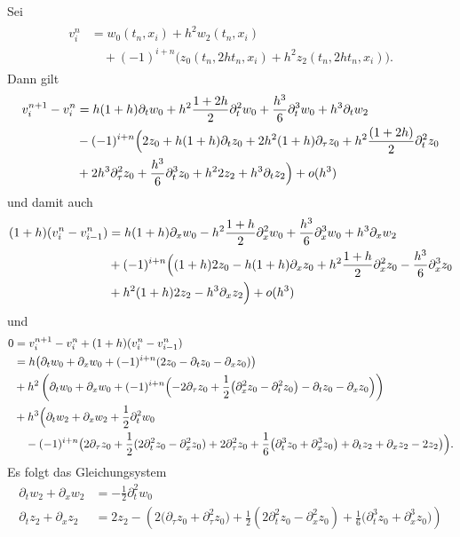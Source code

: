 Sei
\begin{align}
\begin{split}
v^n_i &= w_0(t_n, x_i) + h^2 w_2(t_n, x_i)\\
&\quad + (-1)^{i+n} \bigl( z_0(t_n, 2 h t_n, x_i) + h^2 z_2(t_n, 2 h t_n, x_i) \bigr).
\end{split}
\end{align}
Dann gilt
\begin{align}
\begin{split}
v^{n+1}_i - v^n_i &= h (1 + h) \partial_t w_0 + h^2 \frac{1 + 2h}{2} \partial^2_t w_0 +  \frac{h^3}{6} \partial^3_t w_0 + h^3 \partial_t w_2\\
&- (-1)^{i+n} \Bigl( 2z_0 + h (1 + h) \partial_t z_0  + 2 h^2 (1 + h) \partial_\tau z_0 + h^2 \frac{(1 + 2h)}{2} \partial^2_t z_0\\
& + 2 h^3 \partial^2_\tau z_0 + \frac{h^3}{6} \partial^3_t z_0 + h^2 2 z_2 + h^3 \partial_t z_2 \Bigr) + o(h^3)
\end{split}
\end{align}
und damit auch
\begin{align}
\begin{split}
(1 + h) (v^n_i - v^n_{i-1}) &= h (1 + h) \partial_x w_0 - h^2 \frac{1 + h}{2} \partial^2_x w_0 + \frac{h^3}{6} \partial^3_x w_0+ h^3 \partial_x w_2\\
&+ (-1)^{i+n} \Bigl( (1+h)2z_0 - h(1+h) \partial_x z_0 + h^2 \frac{1+h}{2} \partial^2_x z_0 - \frac{h^3}{6} \partial^3_x z_0\\
&+ h^2 (1 + h) 2 z_2 - h^3 \partial_x z_2 \Bigr) + o(h^3)
\end{split}
\end{align}
und
\begin{align*}
0 &= v^{n+1}_i - v^n_i + (1 + h) (v^n_i - v^n_{i-1})\\
&= h \bigl( \partial_t w_0 + \partial_x w_0  + (-1)^{i+n} (2 z_0 - \partial_t z_0 - \partial_x z_0) \bigr)\\
&+ h^2 \left( \partial_t w_0 + \partial_x w_0 + (-1)^{i+n} \Bigl( - 2 \partial_\tau z_0 + \frac{1}{2} \bigl( \partial^2_x z_0 - \partial^2_t z_0 \bigr)  - \partial_t z_0 - \partial_x z_0 \Bigr) \right)\\
&+ h^3 \Bigl( \partial_t w_2 + \partial_x w_2 + \frac{1}{2} \partial^2_t w_0\\
&\quad - (-1)^{i+n} \bigl( 2 \partial_\tau z_0 + \frac{1}{2} (2\partial^2_t z_0 - \partial^2_x z_0) + 2 \partial^2_\tau z_0 + \frac{1}{6} \bigl(\partial^3_t z_0 + \partial^3_x z_0\bigr) + \partial_t z_2  + \partial_x z_2  - 2 z_2\bigr) \Bigr).
\end{align*}
Es folgt das Gleichungsystem
\begin{align}
\partial_t w_2 + \partial_x w_2 &= - \frac{1}{2} \partial^2_t w_0\\
\partial_t z_2 + \partial_x z_2 &= 2 z_2 - \left( 2 \bigl( \partial_\tau z_0 + \partial^2_\tau z_0 \bigr) + \frac{1}{2} (2\partial^2_t z_0 - \partial^2_x z_0) + \frac{1}{6} \bigl(\partial^3_t z_0 + \partial^3_x z_0\bigr) \right)
\end{align}

